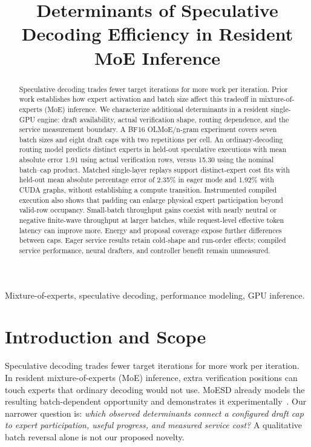 \documentclass[conference,letterpaper]{IEEEtran}
\title{Determinants of Speculative Decoding Efficiency in Resident MoE Inference}
\author{\IEEEauthorblockN{Working research manuscript}
\IEEEauthorblockA{Author names and affiliations pending}}
\begin{document}
\maketitle
\begin{abstract}
Speculative decoding trades fewer target iterations for more work per iteration. Prior work establishes how expert activation and batch size affect this tradeoff in mixture-of-experts (MoE) inference. We characterize additional determinants in a resident single-GPU engine: draft availability, actual verification shape, routing dependence, and the service measurement boundary. A BF16 OLMoE/n-gram experiment covers seven batch sizes and eight draft caps with two repetitions per cell. An ordinary-decoding routing model predicts distinct experts in held-out speculative executions with mean absolute error 1.91 using actual verification rows, versus 15.30 using the nominal batch--cap product. Matched single-layer replays support distinct-expert cost fits with held-out mean absolute percentage error of 2.35\% in eager mode and 1.92\% with CUDA graphs, without establishing a compute transition. Instrumented compiled execution also shows that padding can enlarge physical expert participation beyond valid-row occupancy. Small-batch throughput gains coexist with nearly neutral or negative finite-wave throughput at larger batches, while request-level effective token latency can improve more. Energy and proposal coverage expose further differences between caps. Eager service results retain cold-shape and run-order effects; compiled service performance, neural drafters, and controller benefit remain unmeasured.
\end{abstract}
\begin{IEEEkeywords}
Mixture-of-experts, speculative decoding, performance modeling, GPU inference.
\end{IEEEkeywords}

\section{Introduction and Scope}
Speculative decoding trades fewer target iterations for more work per iteration. In resident mixture-of-experts (MoE) inference, extra verification positions can touch experts that ordinary decoding would not use. MoESD already models the resulting batch-dependent opportunity and demonstrates it experimentally~\cite{moesd}. Our narrower question is: \emph{which observed determinants connect a configured draft cap to expert participation, useful progress, and measured service cost?} A qualitative batch reversal alone is not our proposed novelty.
\end{document}
